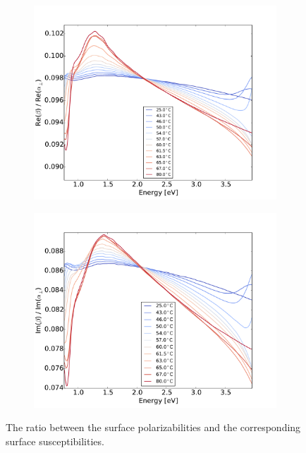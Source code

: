 \begin{figure}[h!]
\begin{subfigure}[b]{0.49\textwidth}
    \end{subfigure}
    \begin{subfigure}[b]{0.49\textwidth}
        \centering
        \includegraphics[width=\textwidth]{Results/Sim3/real_betaDalpha.pdf}
        \caption{}
        \label{fig:2}
    \end{subfigure}
    \begin{subfigure}[b]{0.49\textwidth}
        \centering
        \includegraphics[width=\textwidth]{Results/Sim3/im_betaDalpha.pdf}
        \caption{}
        \label{fig:2}
    \end{subfigure}
    \caption{
       The ratio between the surface polarizabilities and the corresponding surface susceptibilities.
    }
    \label{fig:gammaBetaAlpha}
\end{figure}
%

